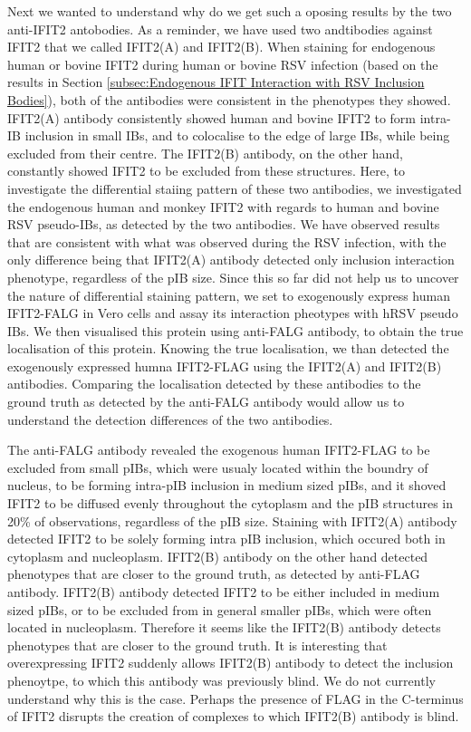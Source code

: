 Next we wanted to understand why do we get such a oposing results by the two anti-IFIT2 antobodies. As a reminder, we have used two andtibodies against IFIT2 that we called IFIT2(A) and IFIT2(B). When staining for endogenous human or bovine IFIT2 during human or bovine RSV infection (based on the results in Section \ref{subsec:Endogenous IFIT Interaction with RSV Inclusion Bodies}), both of the antibodies were consistent in the phenotypes they showed. IFIT2(A) antibody consistently showed human and bovine IFIT2 to form intra-IB inclusion in small IBs, and to colocalise to the edge of large IBs, while being excluded from their centre. The IFIT2(B) antibody, on the other hand, constantly showed IFIT2 to be excluded from these structures. Here, to investigate the differential staiing pattern of these two antibodies, we investigated the endogenous human and monkey IFIT2 with regards to human and bovine RSV pseudo-IBs, as detected by the two antibodies. We have observed results that are consistent with what was observed during the RSV infection, with the only difference being that IFIT2(A) antibody detected only inclusion interaction phenotype, regardless of the pIB size. Since this so far did not help us to uncover the nature of differential staining pattern, we set to exogenously express human IFIT2-FALG in Vero cells and assay its interaction pheotypes with hRSV pseudo IBs. We then visualised this protein using anti-FALG antibody, to obtain the true localisation of this protein. Knowing the true localisation, we than detected the exogenously expressed humna IFIT2-FLAG using the IFIT2(A) and IFIT2(B) antibodies. Comparing the localisation detected by these antibodies to the ground truth as detected by the anti-FALG antibody would allow us to understand the detection differences of the two antibodies.

The anti-FALG antibody revealed the exogenous human IFIT2-FLAG to be excluded from small pIBs, which were usualy located within the boundry of nucleus, to be forming intra-pIB inclusion in medium sized pIBs, and it shoved IFIT2 to be diffused evenly throughout the cytoplasm and the pIB structures in 20\% of observations, regardless of the pIB size. Staining with IFIT2(A) antibody detected IFIT2 to be solely forming intra pIB inclusion, which occured both in cytoplasm and nucleoplasm. IFIT2(B) antibody on the other hand detected phenotypes that are closer to the ground truth, as detected by anti-FLAG antibody. IFIT2(B) antibody detected IFIT2 to be either included in medium sized pIBs, or to be excluded from in general smaller pIBs, which were often located in nucleoplasm. Therefore it seems like the IFIT2(B) antibody detects phenotypes that are closer to the ground truth. It is interesting that overexpressing IFIT2 suddenly allows IFIT2(B) antibody to detect the inclusion phenoytpe, to which this antibody was previously blind. We do not currently understand why this is the case. Perhaps the presence of FLAG in the C-terminus of IFIT2 disrupts the creation of complexes to which IFIT2(B) antibody is blind.

